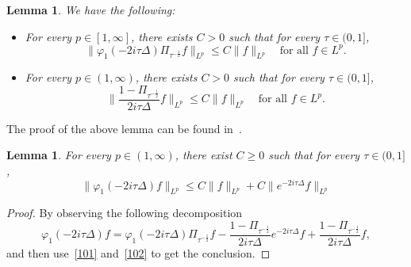\documentclass[10pt,a4paper]{article}
\newtheorem{lemma}[theorem]{Lemma}
\begin{document}
  \begin{lemma}\label{lemfilter1}
    We have the following:
    \begin{itemize}
      \item For every \(p \in [1,\infty]\), there exists \(C>0\) such that for every
        \(\tau \in (0,1]\),
        \begin{equation}\label{101}
          \|\varphi_1(-2i\tau\Delta)\Pi_{\tau^{-\frac12}} f\|_{L^p} \leq
          C\|f\|_{L^p} \quad\text{for all } f \in L^p.
        \end{equation}
      \item For every \(p \in (1,\infty)\), there exists \(C>0\) such that for every
        \(\tau \in (0,1]\),
        \begin{equation}\label{102}
          \|\frac{1-\Pi_{\tau^{-\frac12}}}{2i\tau\Delta} f\|_{L^p} \leq
          C\|f\|_{L^p} \quad\text{for all } f \in L^p.
        \end{equation}
    \end{itemize}
  \end{lemma}

  The proof of the above lemma can be found in~\cite{ORS21}.

  \begin{lemma}\label{varphiLp}
    For every \(p \in (1,\infty)\), there exist \(C \geq 0\) such that for every 
    \(\tau \in (0,1]\),
    \begin{equation}\label{decomp}
      \|\varphi_1(-2i\tau\Delta) f\|_{L^p} \leq C \|f\|_{L^p} + C
      \|e^{-2i\tau\Delta}f\|_{L^p}
    \end{equation}
  \end{lemma}

  \begin{proof}
    By observing the following decomposition 
    \begin{equation}\label{phi1decomp}
      \varphi_1(-2i\tau\Delta) f = \varphi_1(-2i\tau\Delta)\Pi_{\tau^{-\frac12}} f
      - \frac{1 - \Pi_{\tau^{-\frac12}}}{2i\tau\Delta} e^{-2i\tau\Delta} f 
      + \frac{1 - \Pi_{\tau^{-\frac12}}}{2i\tau\Delta} f,
    \end{equation}
    and then use~\eqref{101} and~\eqref{102} to get the conclusion.
  \end{proof}
\end{document}
